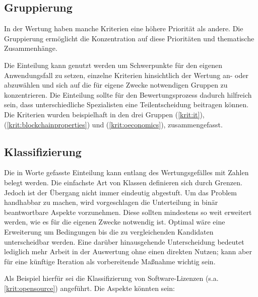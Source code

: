 \subsection{Gruppierung}

In der Wertung haben manche Kriterien eine höhere Priorität als andere.
Die Gruppierung ermöglicht die Konzentration auf diese Prioritäten und thematische Zusammenhänge.

Die Einteilung kann genutzt werden um Schwerpunkte für den eigenen Anwendungsfall zu setzen,
einzelne Kriterien hinsichtlich der Wertung an- oder abzuwählen und sich auf die für eigene Zwecke notwendigen Gruppen zu konzentrieren.
Die Einteilung sollte für den Bewertungsprozess \zB{} dadurch hilfreich sein, dass unterschiedliche Spezialisten eine Teilentscheidung beitragen können.
Die Kriterien wurden beispielhaft in den drei Gruppen  (\ref{krit:it}),  (\ref{krit:blockchainproperties}) und  (\ref{krit:oeconomics}), zusammengefasst.

\subsection{Klassifizierung}\label{classification}

Die in Worte gefasste Einteilung kann entlang des Wertungsgefälles mit Zahlen belegt werden.
Die einfachste Art von Klassen definieren sich durch Grenzen.
Jedoch ist der Übergang nicht immer eindeutig abgestuft.
Um das Problem handhabbar zu machen, wird vorgeschlagen die Unterteilung in binär beantwortbare Aspekte vorzunehmen.
Diese sollten mindestens so weit erweitert werden, wie es für die eigenen Zwecke notwendig ist.
Optimal wäre eine Erweiterung um Bedingungen bis die zu vergleichenden Kandidaten unterscheidbar werden.
Eine darüber hinausgehende Unterscheidung bedeutet lediglich mehr Arbeit in der Auswertung ohne einen direkten Nutzen; kann aber für eine künftige Iteration als vorbereitende Maßnahme wichtig sein.

Als Beispiel hierfür sei die Klassifizierung von Software-Lizenzen (s.a. \ref{krit:opensource}) angeführt.
Die Aspekte könnten sein:


